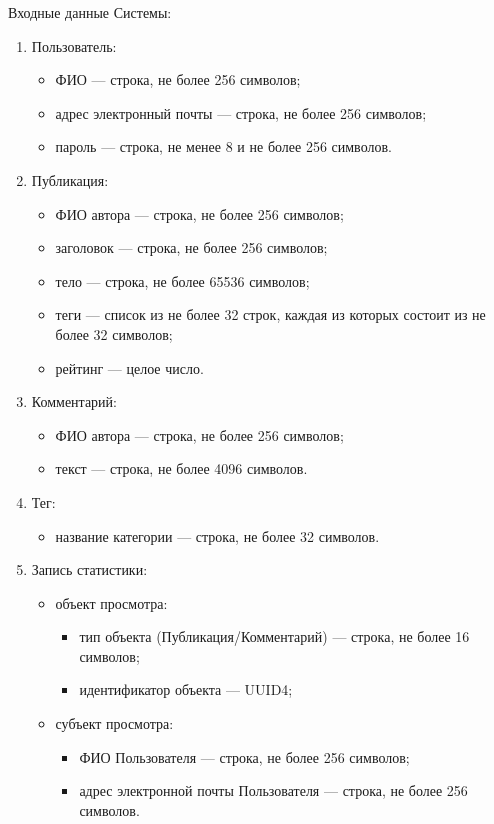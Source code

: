 \documentclass{bmstu-gost-7-32}
\begin{document}
Входные данные Системы:
\begin{enumerate}
	\item Пользователь:
	\begin{itemize}
		\item ФИО — строка, не более 256 символов;
		\item адрес электронный почты — строка, не более 256 символов;
		\item пароль — строка, не менее 8 и не более 256 символов.
	\end{itemize}
	\item Публикация:
	\begin{itemize}
		\item ФИО автора — строка, не более 256 символов;
		\item заголовок — строка, не более 256 символов;
		\item тело — строка, не более 65536 символов;
		\item теги — список из не более 32 строк, каждая из которых состоит из не более 32 символов;
		\item рейтинг — целое число.
	\end{itemize}
	\item Комментарий:
	\begin{itemize}
		\item ФИО автора — строка, не более 256 символов;
		\item текст — строка, не более 4096 символов.
	\end{itemize}
	\item Тег:
	\begin{itemize}
		\item название категории — строка, не более 32 символов.
	\end{itemize}
	\item Запись статистики:
	\begin{itemize}
		\item объект просмотра:
		\begin{itemize}
			\item тип объекта (Публикация/Комментарий) — строка, не более 16 символов;
			\item идентификатор объекта — UUID4;
		\end{itemize}
		\item субъект просмотра:
		\begin{itemize}
			\item ФИО Пользователя — строка, не более 256 символов;
			\item адрес электронной почты Пользователя — строка, не более 256 символов.
		\end{itemize}
	\end{itemize}
\end{enumerate}
\end{document}
